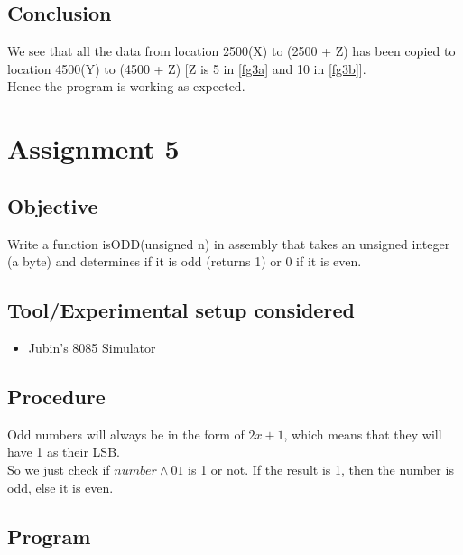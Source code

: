 \documentclass[a4paper]{article} %
\begin{document}
    \subsection{Conclusion}
        We see that all the data from location 2500(X) to (2500 + Z) has been copied to location 4500(Y) to (4500 + Z) [Z is 5 in \ref{fg3a} and 10 in \ref{fg3b}].\\
        Hence the program is working as expected.
\newpage

\section[Check if number odd]{Assignment 5} %
    \subsection{Objective}
        Write a function isODD(unsigned n) in assembly that takes an unsigned integer (a byte) and determines if it is odd (returns 1) or 0 if it is even.
    \subsection{Tool/Experimental setup considered}
        \begin{itemize}
            \item Jubin's 8085 Simulator
        \end{itemize}
    \subsection{Procedure}
        Odd numbers will always be in the form of $2x + 1$, which means that they will have 1 as their LSB.\\
        So we just check if $number \land 01$ is 1 or not. If the result is 1, then the number is odd, else it is even.
    \subsection{Program}
        
\end{document}
